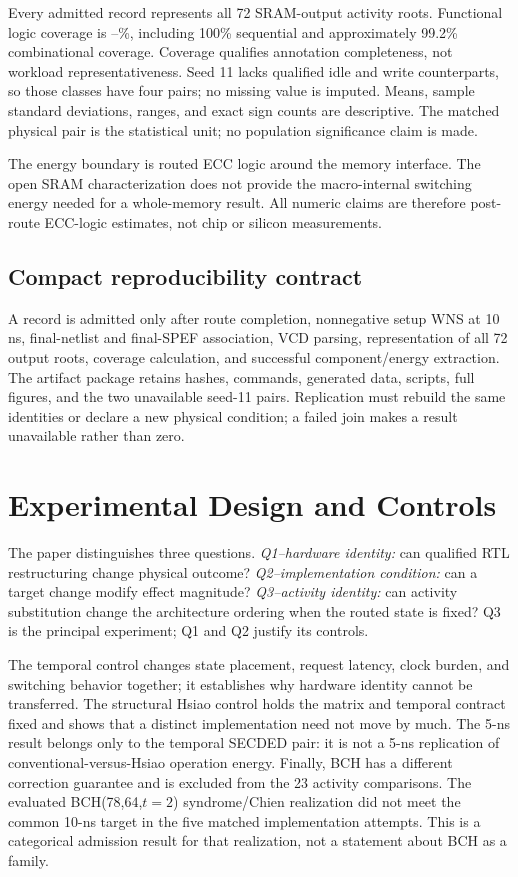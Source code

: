 \documentclass[conference,10pt]{IEEEtran}
\begin{document}
Every admitted record represents all 72 SRAM-output activity roots. Functional logic coverage is \CoverageMin--\CoverageMax\%, including 100\% sequential and approximately 99.2\% combinational coverage. Coverage qualifies annotation completeness, not workload representativeness. Seed 11 lacks qualified idle and write counterparts, so those classes have four pairs; no missing value is imputed. Means, sample standard deviations, ranges, and exact sign counts are descriptive. The matched physical pair is the statistical unit; no population significance claim is made.

The energy boundary is routed ECC logic around the memory interface. The open SRAM characterization does not provide the macro-internal switching energy needed for a whole-memory result. All numeric claims are therefore post-route ECC-logic estimates, not chip or silicon measurements.

\subsection{Compact reproducibility contract}
A record is admitted only after route completion, nonnegative setup WNS at 10 ns, final-netlist and final-SPEF association, VCD parsing, representation of all 72 output roots, coverage calculation, and successful component/energy extraction. The artifact package retains hashes, commands, generated data, scripts, full figures, and the two unavailable seed-11 pairs. Replication must rebuild the same identities or declare a new physical condition; a failed join makes a result unavailable rather than zero.

\section{Experimental Design and Controls}
The paper distinguishes three questions. \emph{Q1--hardware identity:} can qualified RTL restructuring change physical outcome? \emph{Q2--implementation condition:} can a target change modify effect magnitude? \emph{Q3--activity identity:} can activity substitution change the architecture ordering when the routed state is fixed? Q3 is the principal experiment; Q1 and Q2 justify its controls.



The temporal control changes state placement, request latency, clock burden, and switching behavior together; it establishes why hardware identity cannot be transferred. The structural Hsiao control holds the matrix and temporal contract fixed and shows that a distinct implementation need not move by much. The 5-ns result belongs only to the temporal SECDED pair: it is not a 5-ns replication of conventional-versus-Hsiao operation energy. Finally, BCH has a different correction guarantee and is excluded from the 23 activity comparisons. The evaluated BCH(78,64,$t=2$) syndrome/Chien realization did not meet the common 10-ns target in the five matched implementation attempts. This is a categorical admission result for that realization, not a statement about BCH as a family.
\end{document}
